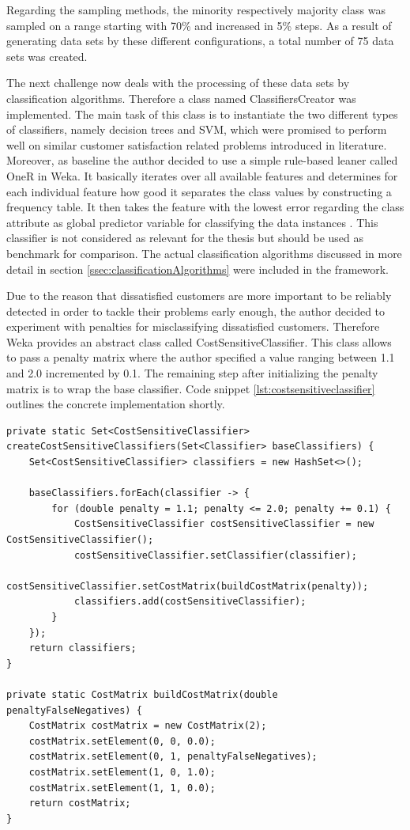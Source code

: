 Regarding the sampling methods, the minority respectively majority class was sampled on a range starting with 70\% and increased in 5\% steps. As a result of generating data sets by these different configurations, a total number of 75 data sets was created. 

The next challenge now deals with the processing of these data sets by classification algorithms. Therefore a class named ClassifiersCreator was implemented. The main task of this class is to instantiate the two different types of classifiers, namely decision trees and SVM, which were promised to perform well on similar customer satisfaction related problems introduced in literature. Moreover, as baseline the author decided to use a simple rule-based leaner called OneR in Weka. It basically iterates over all available features and determines for each individual feature how good it separates the class values by constructing a frequency table. It then takes the feature with the lowest error regarding the class attribute as global predictor variable for classifying the data instances \cite{oneRWeka}. This classifier is not considered as relevant for the thesis but should be used as benchmark for comparison. The actual classification algorithms discussed in more detail in section \ref{ssec:classificationAlgorithms} were included in the framework. 

Due to the reason that dissatisfied customers are more important to be reliably detected in order to tackle their problems early enough, the author decided to experiment with penalties for misclassifying dissatisfied customers. Therefore Weka provides an abstract class called CostSensitiveClassifier. This class allows to pass a penalty matrix where the author specified a value ranging between 1.1 and 2.0 incremented by 0.1. The remaining step after initializing the penalty matrix is to wrap the base classifier. Code snippet \ref{lst:costsensitiveclassifier} outlines the concrete implementation shortly. 

\begin{lstlisting}[caption={Cost sensitive classifier}, label={lst:costsensitiveclassifier}]
private static Set<CostSensitiveClassifier> createCostSensitiveClassifiers(Set<Classifier> baseClassifiers) {
	Set<CostSensitiveClassifier> classifiers = new HashSet<>();
	
	baseClassifiers.forEach(classifier -> {
		for (double penalty = 1.1; penalty <= 2.0; penalty += 0.1) {
			CostSensitiveClassifier costSensitiveClassifier = new CostSensitiveClassifier();
			costSensitiveClassifier.setClassifier(classifier);
			costSensitiveClassifier.setCostMatrix(buildCostMatrix(penalty));
			classifiers.add(costSensitiveClassifier);
		}
	});
	return classifiers;
}

private static CostMatrix buildCostMatrix(double penaltyFalseNegatives) {
	CostMatrix costMatrix = new CostMatrix(2);
	costMatrix.setElement(0, 0, 0.0);
	costMatrix.setElement(0, 1, penaltyFalseNegatives);
	costMatrix.setElement(1, 0, 1.0);
	costMatrix.setElement(1, 1, 0.0);
	return costMatrix;
}
\end{lstlisting}

